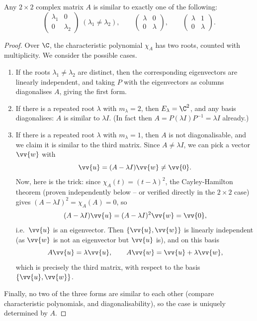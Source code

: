 \begin{theorem}
	Any $2 \times 2$ complex matrix $A$ is similar to exactly one of the following:
	$$
	\begin{pmatrix}
		\lambda_1 & 0 \\ 0 & \lambda_2
	\end{pmatrix} \; (\lambda_1 \neq \lambda_2), \quad\quad
	\begin{pmatrix}
		\lambda & 0 \\ 0 & \lambda
	\end{pmatrix}, \quad\quad
	\begin{pmatrix}
		\lambda & 1 \\ 0 & \lambda
	\end{pmatrix}.
	$$
\end{theorem}
\begin{proof}
	Over $\C$, the characteristic polynomial $\chi_A$ has two roots, counted with multiplicity. We consider the possible cases.
	\begin{enumerate}[label=(\roman*)]
		\item If the roots $\lambda_1 \neq \lambda_2$ are distinct, then the corresponding eigenvectors are linearly independent, and taking $P$ with the eigenvectors as columns diagonalises $A$, giving the first form.
		\item If there is a repeated root $\lambda$ with $m_\lambda = 2$, then $E_\lambda = \C^2$, and any basis diagonalises: $A$ is similar to $\lambda I$. (In fact then $A = P(\lambda I)P^{-1} = \lambda I$ already.)
		\item If there is a repeated root $\lambda$ with $m_\lambda = 1$, then $A$ is not diagonalisable, and we claim it is similar to the third matrix. Since $A \neq \lambda I$, we can pick a vector $\vv{w}$ with
		$$
		\vv{u} = (A - \lambda I)\vv{w} \neq \vv{0}.
		$$
		Now, here is the trick: since $\chi_A(t) = (t - \lambda)^2$, the Cayley-Hamilton theorem (proven independently below -- or verified directly in the $2\times 2$ case) gives $(A - \lambda I)^2 = \chi_A(A) = 0$, so
		$$
		(A - \lambda I)\vv{u} = (A - \lambda I)^2 \vv{w} = \vv{0},
		$$
		i.e.\ $\vv{u}$ is an eigenvector. Then $\{\vv{u}, \vv{w}\}$ is linearly independent (as $\vv{w}$ is not an eigenvector but $\vv{u}$ is), and on this basis
		$$
		A \vv{u} = \lambda \vv{u}, \quad \quad A \vv{w} = \vv{u} + \lambda \vv{w},
		$$
		which is precisely the third matrix, with respect to the basis $\{\vv{u}, \vv{w}\}$.
	\end{enumerate}
	Finally, no two of the three forms are similar to each other (compare characteristic polynomials, and diagonalisability), so the case is uniquely determined by $A$.
\end{proof}

